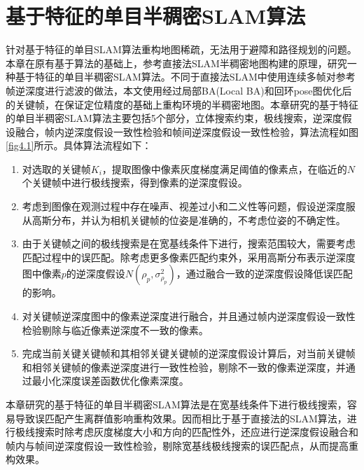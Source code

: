 
\chapter{基于特征的单目半稠密SLAM算法}
\label{chap:Semi-Dense}

针对基于特征的单目SLAM算法重构地图稀疏，无法用于避障和路径规划的问题。本章在原有基于算法的基础上，参考直接法SLAM半稠密地图构建的原理，研究一种基于特征的单目半稠密SLAM算法。不同于直接法SLAM中使用连续多帧对参考帧逆深度进行滤波的做法，本文使用经过局部BA(Local BA)和回环pose图优化后的关键帧，在保证定位精度的基础上重构环境的半稠密地图。本章研究的基于特征的单目半稠密SLAM算法主要包括5个部分，立体搜索约束，极线搜索，逆深度假设融合，帧内逆深度假设一致性检验和帧间逆深度假设一致性检验，算法流程如图\ref{fig4.1}所示。具体算法流程如下：
\begin{enumerate}[label={(\arabic*)}]

\item 对选取的关键帧$K_i$，提取图像中像素灰度梯度满足阈值的像素点，在临近的$N$个关键帧中进行极线搜索，得到像素的逆深度假设。

\item 考虑到图像在观测过程中存在噪声、视差过小和二义性等问题，假设逆深度服从高斯分布\upcite{[4.1]}，并认为相机关键帧的位姿是准确的，不考虑位姿的不确定性。

\item 由于关键帧之间的极线搜索是在宽基线条件下进行，搜索范围较大，需要考虑匹配过程中的误匹配。除考虑更多像素匹配约束外，采用高斯分布表示逆深度图中像素$p$的逆深度假设$N(\rho_p, \sigma_{\rho_p}^2)$，通过融合一致的逆深度假设降低误匹配的影响。

\item 对关键帧逆深度图中的像素逆深度进行融合，并且通过帧内逆深度假设一致性检验剔除与临近像素逆深度不一致的像素。

\item 完成当前关键关键帧和其相邻关键关键帧的逆深度假设计算后，对当前关键帧和相邻关键帧的像素逆深度进行一致性检验，剔除不一致的像素逆深度，并通过最小化深度误差函数优化像素深度。

\end{enumerate}

本章研究的基于特征的单目半稠密SLAM算法是在宽基线条件下进行极线搜索，容易导致误匹配产生离群值影响重构效果。因而相比于基于直接法的SLAM算法，进行极线搜索时除考虑灰度梯度大小和方向的匹配性外，还应进行逆深度假设融合和帧内与帧间逆深度假设一致性检验，剔除宽基线极线搜索的误匹配点，从而提高重构效果。

